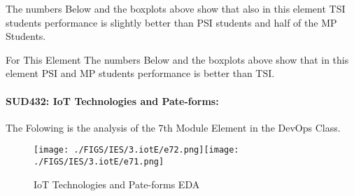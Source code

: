 \documentclass[12pt]{extreport}
\begin{document}
The numbers Below and the boxplots above show that also in this element  TSI students performance is slightly better than PSI students and half of the MP Students.

For This Element The numbers Below and the boxplots above show that in this element  PSI and MP students performance is  better than TSI.


\begin{comment}

\begin{enumerate}	
	\item The MP Class Box-Plot:
	\begin{enumerate}
		\item MAX = a {} {} {} {} {} {} {} {} UQ = b {} {} {} {} {} {} {} {} Median = c
		\item LQ = d {} {} {} {} {} {} {} {}  MIN =	l {} {} {} {} {} {} {} {}  IQR = e - f = g
	\end{enumerate}
	\item The PSI Class Box-Plot:
	\begin{enumerate}
		\item MAX = a {} {} {} {} {} {} {} {} UQ = b {} {} {} {} {} {} {} {} Median = c
		\item LQ = d {} {} {} {} {} {} {} {}  MIN =	e {} {} {} {} {} {} {} {} IQR = f - g = h	
	\end{enumerate}
	\item The TSI Class Box-Plot:
	\begin{enumerate}
		\item MAX = a {} {} {} {} {} {} {} {} UQ = b {} {} {} {} {} {} {} {} Median = c
		\item LQ = d {} {} {} {} {} {} {} {} MIN = e {} {} {} {} {} {} {} {} IQR = f - g = h	
	\end{enumerate}
\end{enumerate}
\end{comment}







\paragraph{\large SUD432: IoT Technologies and Pate-forms:\\
} The Folowing is the analysis of the 7th Module Element in the DevOps Class.

\begin{figure}[H]
	\centering
	\texttt{[image: ./FIGS/IES/3.iotE/e72.png]}\texttt{[image: ./FIGS/IES/3.iotE/e71.png]}
	\caption{IoT Technologies and Pate-forms EDA}
	\label{fig:36}
\end{figure}
\end{document}

